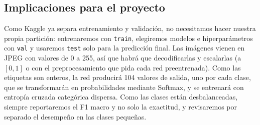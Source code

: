 \subsection{Implicaciones para el proyecto}
Como Kaggle ya separa entrenamiento y validación, no necesitamos hacer nuestra propia partición: entrenaremos con \texttt{train}, elegiremos modelos e hiperparámetros con \texttt{val} y usaremos \texttt{test} solo para la predicción final. Las imágenes vienen en JPEG con valores de 0 a 255, así que habrá que decodificarlas y escalarlas (a $[0,1]$ o con el preprocesamiento que pida cada red preentrenada). Como las etiquetas son enteros, la red producirá 104 valores de salida, uno por cada clase, que se transformarán en probabilidades mediante Softmax, y se entrenará con entropía cruzada categórica dispersa. Como las clases están desbalanceadas, siempre reportaremos el F1 macro y no solo la exactitud, y revisaremos por separado el desempeño en las clases pequeñas.
